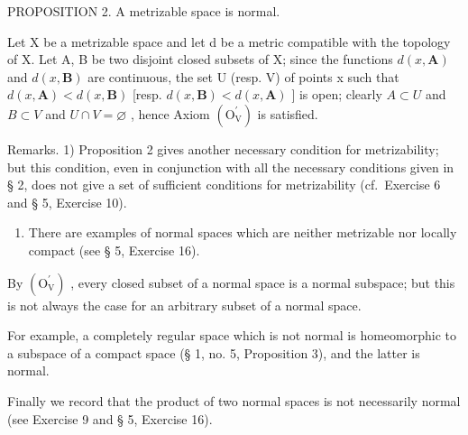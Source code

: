 PROPOSITION 2. A metrizable space is normal.

Let X be a metrizable space and let d be a metric compatible with the topology of X. Let A, B be two disjoint closed subsets of X; since the functions \(d(x, \mathbf{A})\) and \(d(x, \mathbf{B})\) are continuous, the set U (resp. V) of points x such that \(d(x, \mathbf{A}) < d(x, \mathbf{B})\) {[}resp. \(d(x, \mathbf{B}) < d(x, \mathbf{A})\) {]} is open; clearly \(A \subset U\) and \(B \subset V\) and \(U \cap V = \varnothing\) , hence Axiom \((\mathrm{O}_{\mathrm{V}}^{\prime})\) is satisfied.

Remarks. 1) Proposition 2 gives another necessary condition for metrizability; but this condition, even in conjunction with all the necessary conditions given in § 2, does not give a set of sufficient conditions for metrizability (cf.~Exercise 6 and § 5, Exercise 10).

\begin{enumerate}
\def\labelenumi{\arabic{enumi})}
\setcounter{enumi}{1}
\tightlist
\item
  There are examples of normal spaces which are neither metrizable nor locally compact (see § 5, Exercise 16).
\end{enumerate}

By \((\mathrm{O}_{\mathrm{V}}^{\prime})\) , every closed subset of a normal space is a normal subspace; but this is not always the case for an arbitrary subset of a normal space.

For example, a completely regular space which is not normal is homeomorphic to a subspace of a compact space (§ 1, no. 5, Proposition 3), and the latter is normal.

Finally we record that the product of two normal spaces is not necessarily normal (see Exercise 9 and § 5, Exercise 16).

